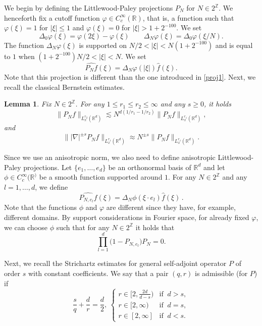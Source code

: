 \documentclass[10pt,leqno]{amsart}
\newtheorem{lem}[thm]{Lemma}
\newcommand{\R}{\mathbb{R}}
\numberwithin{equation}{section}
\newcommand{\Z}{\mathbb{Z}}
\begin{document}
We begin by defining the Littlewood-Paley projections $P_N$ for $N\in 2^{\Z}$. We henceforth fix a cutoff function $\varphi \in C_{c}^{\infty} (\R)$, that is, 
a function such that $\varphi (\xi)=1$ for $|\xi|\leq 1$ and $\varphi (\xi)=0$ for $|\xi|>1+2^{-100}$. We set
\begin{equation}\label{dyadic-anulus-bump}
\Delta_{0}\varphi(\xi)=\varphi(2\xi)-\varphi(\xi)\qquad\Delta_{N}\varphi(\xi)=\Delta_{0}\varphi(\xi/N) .
\end{equation}
The function \(\Delta_{N}\varphi(\xi)\) is supported on \(N/2<|\xi|<N(1+2^{-100})\) and is equal to \(1\) when \((1+2^{-100})N/2<|\xi|<N\). We set
\begin{equation}\label{LPproj}
\widehat{P_N f} (\xi)= \Delta_{N}\varphi(|\xi|)\hat{f} (\xi).
\end{equation} 
Note that this projection is different than the one introduced in \eqref{proj1}. Next, we recall the classical Bernstein estimates.

\begin{lem}
\label{bern}
Fix $N\in 2^{\Z}$. For any $1\leq r_1 \leq r_2 \leq \infty$ and any $s\geq 0$, it holds
$$\|P_N f\|_{L_x^{r_2} (\R^d)}\lesssim N^{d(1/r_1 - 1/r_2)} \|P_N f\|_{L_x^{r_1}(\R^d)},$$
and
$$\||\nabla|^{\pm s} P_N f \|_{L_x^{r_1} (\R^d)} \approx N^{\pm s} \|P_N f\|_{L_x^{r_1} (\R^d)}.$$
\end{lem}
Since we use an anisotropic norm, we also need to define anisotropic Littlewood-Paley projections. Let $\{e_1 ,\ldots, e_d\}$ be an orthonormal basis of $\R^d$
and let $\phi \in C^\infty_c(\R^)$ be a smooth function supported around $1$. For any $N\in 2^{\Z}$ and any $l=1,\ldots ,d$, we define
\begin{equation} \label{LP-anisotropic}
\widehat{P_{N,e_l} f} (\xi) = \Delta_{N}\phi(\xi\cdot e_l)\hat{f} (\xi) \,.
\end{equation}
Note that the functions $\phi$ and $\varphi$ are different since they have, for example, different domains.
 By support considerations in Fourier space, for already fixed $\varphi$, we can choose $\phi$ such that for any \( N \in 2^{\Z}\) it holds that
\begin{equation}
\label{e1}
\prod_{l=1}^{d} \Big( 1-  P_{N,e_l}\Big) P_{N} =0.
\end{equation}


Next, we recall the Strichartz estimates for general self-adjoint operator $P$ of order $s$ with constant coefficients. We say that a pair $(q,r)$ is admissible (for $P$) if
\begin{equation}
\label{defadmissible}
\frac{s}{q} +\frac{d}{r}=\frac{d}{2},\ 
\begin{cases}r\in [2, \frac{2d}{d-s}) & \textrm{if } \ d> s, \\  
r\in [2,\infty ) & \textrm{if } \ d=s,\\ 
r\in [2,\infty] &  \textrm{if } \ d <  s. 
\end{cases}
\end{equation}
\end{document}
